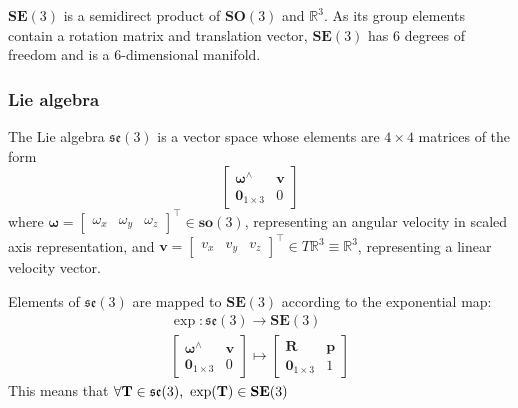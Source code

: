 		$\textbf{SE}(3)$ is a semidirect product of $\textbf{SO}(3)$ and $ \mathbb{R}^3$. As its group elements contain a rotation matrix and translation vector, $\textbf{SE}(3)$ has 6 degrees of freedom and is a 6-dimensional manifold.
			
		\subsubsection{Lie algebra}
		The Lie algebra $\mathfrak{se}(3)$ is a vector space whose elements are $4 \times 4$ matrices of the form
		\begin{equation}
			\begin{bmatrix}
				  \bm{\omega}^{\wedge}	&  \mathbf{v}\\
				  \textbf{0}_{1 \times 3} & 0						  
			\end{bmatrix}
		\end{equation}
		where $\bm{\omega} =
		\begin{bmatrix}
			\omega_x & \omega_y & \omega_z				
		\end{bmatrix}
		^\top \in \mathbf{so}(3)$, representing an angular velocity in scaled axis representation, and
		$\mathbf{v} = 
		\begin{bmatrix}
			v_x & v_y & v_z				
		\end{bmatrix}
		^\top \in T\mathbb{R}^3 \equiv \mathbb{R}^3$, representing a linear velocity vector.
		
		Elements of $\mathfrak{se}(3)$ are mapped to $\textbf{SE}(3)$ according to the exponential map:
			\begin{equation}
				\begin{split}
					\exp: \mathfrak{se}(3) \rightarrow \mathbf{SE}(3)\\
					\begin{bmatrix}
						  \bm{\omega}^{\wedge}	&  \mathbf{v}\\
						  \textbf{0}_{1 \times 3} & 0						  
					\end{bmatrix}
					\mapsto 
					\begin{bmatrix}
						  \mathbf{R}	&	\mathbf{p} \\
						  \textbf{0}_{1 \times 3}		& 	1 
					\end{bmatrix}
				\end{split}		
			\end{equation}		
			This means that $\forall \mathbf{T} \in \mathfrak{se}(3) \textnormal{, } \exp(\mathbf{T}) \in  \mathbf{SE}(3)$
			
